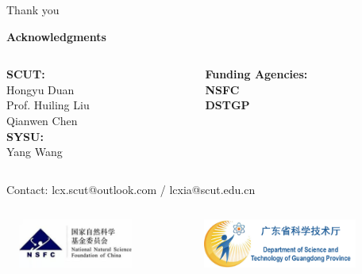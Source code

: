 \documentclass{beamer}
\begin{document}
\begin{frame}{Thank you}

\vspace{0.2cm}

\small
\textbf{Acknowledgments}
\vspace{0.4cm}
\begin{columns}
\begin{column}{0.5\textwidth}
\hspace{1em}\textbf{SCUT:}\\
\vspace{0.1cm}
\hspace{1em}Hongyu Duan\\
\hspace{1em}Prof. Huiling Liu\\
\hspace{1em}Qianwen Chen\\
\vspace{0.1cm}
\hspace{1em}\textbf{SYSU:}\\
\hspace{1em}Yang Wang
\end{column}
\begin{column}{0.5\textwidth}
\textbf{Funding Agencies:}\\
\vspace{0.3cm}
\textbf{NSFC}\\
\vspace{0.3cm}
\textbf{DSTGP}
\end{column}
\end{columns}

\vspace{0.3cm}
Contact: lcx.scut@outlook.com / lcxia@scut.edu.cn
\vspace{0.3cm}

\begin{columns}
\begin{column}{0.5\textwidth}
\centering
\includegraphics[width=0.8\textwidth,height=1.6cm,keepaspectratio]{./assets/NNSFC.logo.jpeg}
\end{column}
\begin{column}{0.5\textwidth}
\centering
\includegraphics[width=0.8\textwidth,height=1.6cm,keepaspectratio]{./assets/dstgp.logo.png}
\end{column}
\end{columns}

\end{frame}
\end{document}
